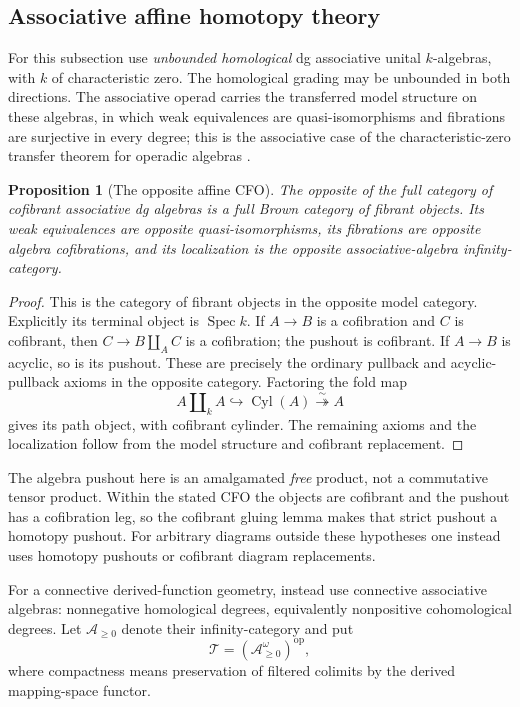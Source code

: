 \documentclass[12pt]{amsart}
\newtheorem{prop}[thm]{Proposition}
\theoremstyle{definition}
\theoremstyle{remark}
\numberwithin{equation}{section}
\newcommand{\op}{\mathrm{op}}
\DeclareMathOperator{\Spec}{Spec}
\begin{document}
\subsection{Associative affine homotopy theory}

For this subsection use \emph{unbounded homological} dg
associative unital $k$-algebras, with $k$ of characteristic zero.
The homological grading may be unbounded in both directions.
The associative operad carries the transferred model
structure on these algebras, in which weak equivalences are
quasi-isomorphisms and fibrations are surjective in every degree;
this is the associative case of the characteristic-zero transfer
theorem for operadic algebras \cite{Hinich2015}.

\begin{prop}[The opposite affine CFO]\label{prop:nc-affine-cfo}
The opposite of the full category of cofibrant associative
dg algebras is a full Brown category of fibrant objects. Its weak
equivalences are opposite quasi-isomorphisms, its fibrations are
opposite algebra cofibrations, and its localization is the
opposite associative-algebra infinity-category.
\end{prop}

\begin{proof}
This is the category of fibrant objects in the opposite model
category. Explicitly its terminal object is $\Spec k$. If
$A\to B$ is a cofibration and $C$ is cofibrant, then
$C\to B\amalg_A C$ is a cofibration; the pushout is cofibrant.
If $A\to B$ is acyclic, so is its pushout. These are precisely
the ordinary pullback and acyclic-pullback axioms in the opposite
category. Factoring the fold map
\[
 A\amalg_k A\hookrightarrow\operatorname{Cyl}(A)
                  \overset{\sim}{\twoheadrightarrow}A
\]
gives its path object, with cofibrant cylinder. The remaining
axioms and the localization follow from the model structure and
cofibrant replacement.
\end{proof}

The algebra pushout here is an amalgamated \emph{free} product,
not a commutative tensor product. Within the stated CFO the
objects are cofibrant and the pushout has a cofibration leg, so
the cofibrant gluing lemma makes that strict pushout a homotopy
pushout. For arbitrary diagrams outside these hypotheses one
instead uses homotopy pushouts or cofibrant diagram replacements.

For a connective derived-function geometry, instead use
connective associative algebras: nonnegative homological degrees,
equivalently nonpositive cohomological degrees. Let
$\mathcal A_{\ge0}$ denote their infinity-category and put
\begin{equation}\label{eq:nc-compact-affines}
 \mathcal T=(\mathcal A_{\ge0}^{\omega})^{\op},
\end{equation}
where compactness means preservation of filtered colimits by the
derived mapping-space functor.
\end{document}
